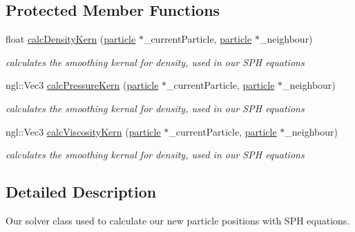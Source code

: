 \subsection*{Protected Member Functions}
\begin{DoxyCompactItemize}
\item 
float \hyperlink{classSPHSolver_a70dd03e826824255b9fc76c67da53e19}{calc\-Density\-Kern} (\hyperlink{classparticle}{particle} $\ast$\-\_\-current\-Particle, \hyperlink{classparticle}{particle} $\ast$\-\_\-neighbour)
\begin{DoxyCompactList}\small\item\em calculates the smoothing kernal for density, used in our S\-P\-H equations \end{DoxyCompactList}\item 
ngl\-::\-Vec3 \hyperlink{classSPHSolver_a89a6fc730abeab6ae96c015ae9682ac1}{calc\-Pressure\-Kern} (\hyperlink{classparticle}{particle} $\ast$\-\_\-current\-Particle, \hyperlink{classparticle}{particle} $\ast$\-\_\-neighbour)
\begin{DoxyCompactList}\small\item\em calculates the smoothing kernal for density, used in our S\-P\-H equations \end{DoxyCompactList}\item 
ngl\-::\-Vec3 \hyperlink{classSPHSolver_a42e9c556eb3bfec29ef90c08545dff30}{calc\-Viscosity\-Kern} (\hyperlink{classparticle}{particle} $\ast$\-\_\-current\-Particle, \hyperlink{classparticle}{particle} $\ast$\-\_\-neighbour)
\begin{DoxyCompactList}\small\item\em calculates the smoothing kernal for density, used in our S\-P\-H equations \end{DoxyCompactList}\end{DoxyCompactItemize}


\subsection{Detailed Description}
Our solver class used to calculate our new particle positions with S\-P\-H equations. 

